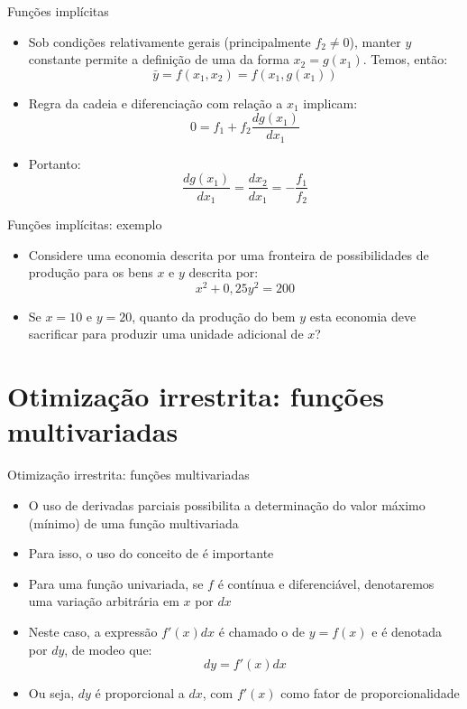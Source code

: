 \documentclass[10pt]{beamer}
\begin{document}
\begin{frame}
    {Funções implícitas}
    \begin{itemize}
        \item Sob condições relativamente gerais (principalmente $f_2\neq 0$), manter $y$ constante permite a definição de uma  da forma $x_2 = g(x_1)$. Temos, então:
        \[
          \bar{y} = f(x_1, x_2) = f(x_1, g(x_1))  
        \]
        \item Regra da cadeia e diferenciação com relação a $x_1$ implicam:
        \[
            0 = f_1 + f_2 \frac{d g(x_1)}{d x_1}
        \]
        \item Portanto:
        \[
          \frac{d g(x_1)}{d x_1} = \frac{d x_2}{d x_1} = -\frac{f_1}{f_2}  
        \]
    \end{itemize}
\end{frame}

\begin{frame}
    {Funções implícitas: exemplo}
    \begin{itemize}
        \item Considere uma economia descrita por uma fronteira de possibilidades de produção para os bens $x$ e $y$ descrita por:
        \[
          x^2 + 0,25y^2 = 200  
        \]
        \item Se $x = 10$ e $y = 20$, quanto da produção do bem $y$ esta economia deve sacrificar para produzir uma unidade adicional de $x$?
    \end{itemize}
\end{frame}

\section{Otimização irrestrita: funções multivariadas}
\begin{frame}
    {Otimização irrestrita: funções multivariadas}
    \begin{itemize}
        \item O uso de derivadas parciais possibilita a determinação do valor máximo (mínimo) de uma função multivariada\bigskip
        \item Para isso, o uso do conceito de  é importante\bigskip
        \item Para uma função univariada, se $f$ é contínua e diferenciável, denotaremos uma variação arbitrária em $x$ por $d x$\bigskip
        \item Neste caso, a expressão $f'(x) dx$ é chamado o  de $y = f(x)$ e é denotada por $dy$, de modeo que:
        \[
          dy = f'(x)dx  
        \]
        \item Ou seja, $dy$ é proporcional a $dx$, com $f'(x)$ como fator de proporcionalidade
    \end{itemize}
\end{frame}
\end{document}
